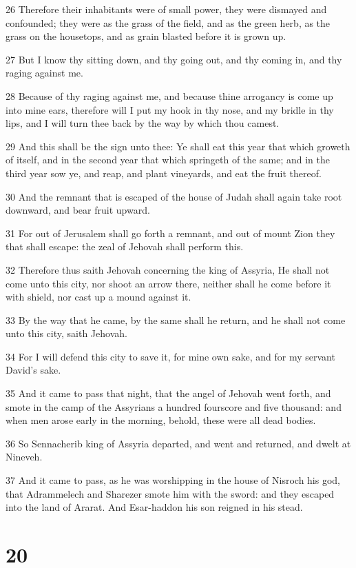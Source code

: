 \par 26 Therefore their inhabitants were of small power, they were dismayed and confounded; they were as the grass of the field, and as the green herb, as the grass on the housetops, and as grain blasted before it is grown up.
\par 27 But I know thy sitting down, and thy going out, and thy coming in, and thy raging against me.
\par 28 Because of thy raging against me, and because thine arrogancy is come up into mine ears, therefore will I put my hook in thy nose, and my bridle in thy lips, and I will turn thee back by the way by which thou camest.
\par 29 And this shall be the sign unto thee: Ye shall eat this year that which groweth of itself, and in the second year that which springeth of the same; and in the third year sow ye, and reap, and plant vineyards, and eat the fruit thereof.
\par 30 And the remnant that is escaped of the house of Judah shall again take root downward, and bear fruit upward.
\par 31 For out of Jerusalem shall go forth a remnant, and out of mount Zion they that shall escape: the zeal of Jehovah shall perform this.
\par 32 Therefore thus saith Jehovah concerning the king of Assyria, He shall not come unto this city, nor shoot an arrow there, neither shall he come before it with shield, nor cast up a mound against it.
\par 33 By the way that he came, by the same shall he return, and he shall not come unto this city, saith Jehovah.
\par 34 For I will defend this city to save it, for mine own sake, and for my servant David's sake.
\par 35 And it came to pass that night, that the angel of Jehovah went forth, and smote in the camp of the Assyrians a hundred fourscore and five thousand: and when men arose early in the morning, behold, these were all dead bodies.
\par 36 So Sennacherib king of Assyria departed, and went and returned, and dwelt at Nineveh.
\par 37 And it came to pass, as he was worshipping in the house of Nisroch his god, that Adrammelech and Sharezer smote him with the sword: and they escaped into the land of Ararat. And Esar-haddon his son reigned in his stead.

\chapter{20}


